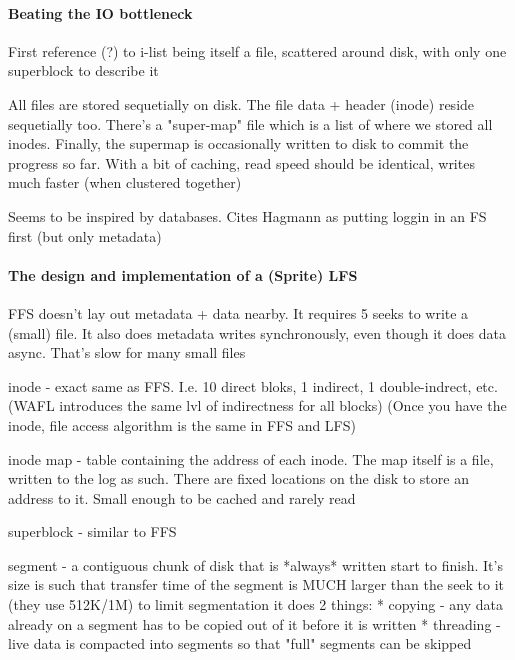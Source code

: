 \documentclass[a4paper]{article}
\begin{document}
        \paragraph{Beating the IO bottleneck}
        First reference (?) to i-list being itself a file, scattered around
        disk, with only one superblock to describe it

        All files are stored sequetially on disk. The file data + header
        (inode) reside sequetially too. There's a "super-map" file which is a
        list of where we stored all inodes. Finally, the supermap is
        occasionally written to disk to commit the progress so far. With a bit
        of caching, read speed should be identical, writes much faster (when
        clustered together)

        Seems to be inspired by databases. Cites Hagmann as putting loggin in
        an FS first (but only metadata)

        \paragraph{The design and implementation of a (Sprite) LFS}

        FFS doesn't lay out metadata + data nearby. It requires 5 seeks to
        write a (small) file. It also does metadata writes synchronously, even
        though it does data async. That's slow for many small files

        inode - exact same as FFS. I.e. 10 direct bloks, 1 indirect, 1
        double-indrect, etc. (WAFL introduces the same lvl of indirectness for
        all blocks) (Once you have the inode, file access algorithm is the same
        in FFS and LFS)

        inode map - table containing the address of each inode. The map itself
        is a file, written to the log as such. There are fixed locations on the
        disk to store an address to it. Small enough to be cached and rarely
        read

        superblock - similar to FFS

        segment - a contiguous chunk of disk that is *always* written start to
        finish. It's size is such that transfer time of the segment is MUCH
        larger than the seek to it (they use 512K/1M)
        to limit segmentation it does 2 things:
          * copying - any data already on a segment has to be copied out of it
            before it is written
          * threading - live data is compacted into segments so that "full"
            segments can be skipped
\end{document}
